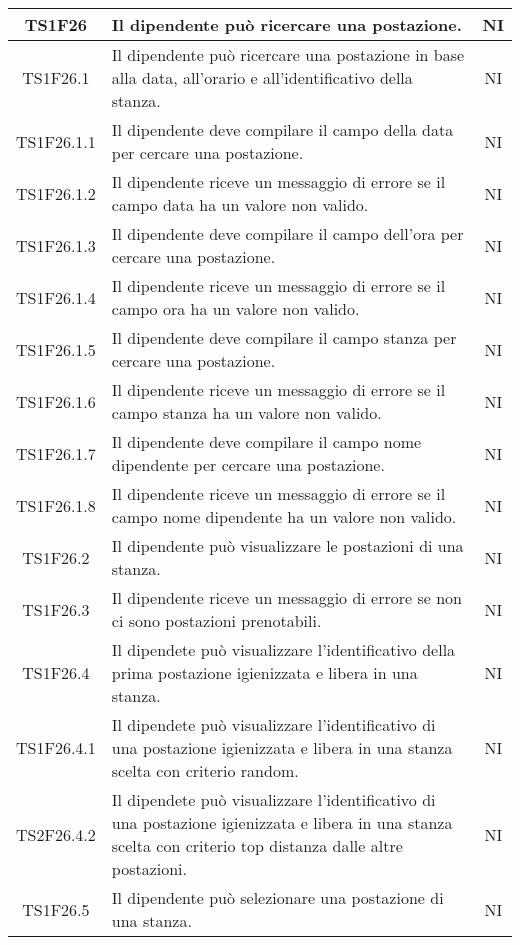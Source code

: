 \begin{center}
\begin{longtable}{|c|p{10cm}|c|}
			TS1F26 & Il dipendente può ricercare una postazione. & NI \\	
			\hline
			TS1F26.1 & Il dipendente può ricercare una postazione in base alla data, all'orario e all'identificativo della stanza. & NI \\	
			\hline
			TS1F26.1.1 & Il dipendente deve compilare il campo della data per cercare una postazione. & NI \\	
			\hline
			TS1F26.1.2 & Il dipendente riceve un messaggio di errore se il campo data ha un valore non valido. & NI \\	
			\hline
			TS1F26.1.3 & Il dipendente deve compilare il campo dell'ora per cercare una postazione. & NI \\	
			\hline
			TS1F26.1.4 & Il dipendente riceve un messaggio di errore se il campo ora ha un valore non valido. & NI \\	
			\hline			
			TS1F26.1.5 & Il dipendente deve compilare il campo stanza per cercare una postazione. & NI \\	
			\hline
			TS1F26.1.6 & Il dipendente riceve un messaggio di errore se il campo stanza ha un valore non valido. & NI \\	
			\hline			
			TS1F26.1.7 & Il dipendente deve compilare il campo nome dipendente per cercare una postazione. & NI \\	
			\hline
			TS1F26.1.8 & Il dipendente riceve un messaggio di errore se il campo nome dipendente ha un valore non valido. & NI \\	
			\hline
			TS1F26.2 & Il dipendente può visualizzare le postazioni di una stanza. & NI \\	
			\hline
			TS1F26.3 & Il dipendente riceve un messaggio di errore se non ci sono postazioni prenotabili. & NI \\	
			\hline
			TS1F26.4 & Il dipendete può visualizzare l'identificativo della prima postazione igienizzata e libera in una stanza. & NI \\	
			\hline
			TS1F26.4.1 & Il dipendete può visualizzare l'identificativo di una postazione igienizzata e libera in una stanza scelta con criterio random. & NI \\	
			\hline
			TS2F26.4.2 & Il dipendete può visualizzare l'identificativo di una postazione igienizzata e libera in una stanza scelta con criterio top distanza dalle altre postazioni. & NI \\	
			\hline
			TS1F26.5 & Il dipendente può selezionare una postazione di una stanza. & NI \\	
			\hline

\end{longtable}
\end{center}
